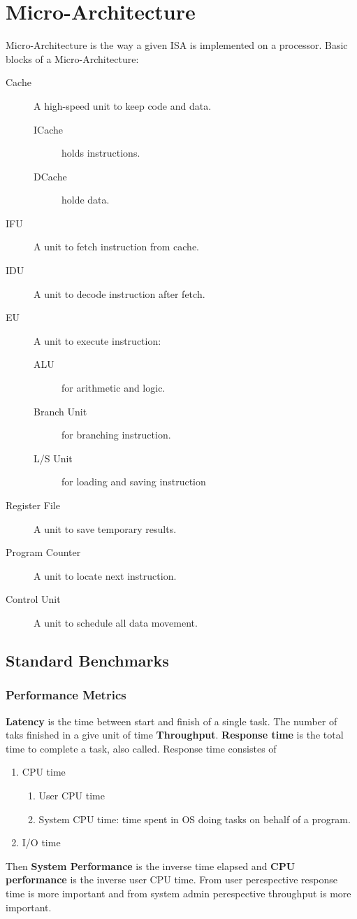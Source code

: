 \chapter{Micro-Architecture}
Micro-Architecture is the way a given ISA is implemented on a processor.
Basic blocks of a Micro-Architecture:
\begin{description}
    \item [Cache] A high-speed unit to keep code and data.
          \begin{description}
              \item [ICache] holds instructions.
              \item [DCache] holde data.
          \end{description}
    \item [IFU] A unit to fetch instruction from cache.
    \item [IDU] A unit to decode instruction after fetch.
    \item [EU] A unit to execute instruction:
          \begin{description}
              \item [ALU] for arithmetic and logic.
              \item [Branch Unit] for branching instruction.
              \item [L/S Unit] for loading and saving instruction
          \end{description}
    \item [Register File] A unit to save temporary results.
    \item [Program Counter] A unit to locate next instruction.
    \item [Control Unit] A unit to schedule all data movement.
\end{description}

\section{Standard Benchmarks}
\subsection{Performance Metrics}
\textbf{Latency} is the time between start and finish of a single task. The number of taks finished in a give unit of time \textbf{Throughput}.
\textbf{Response time} is the total time to complete a task, also called.
Response time consistes of
\begin{enumerate}
    \item CPU time
          \begin{enumerate}
              \item User CPU time
              \item System CPU time: time spent in OS doing tasks on behalf of a program.
          \end{enumerate}
    \item I/O time
\end{enumerate}
Then \textbf{System Performance} is the inverse time elapsed and \textbf{CPU performance} is the inverse user CPU time. From user perespective response time is more important and from system admin perespective throughput is more important.


